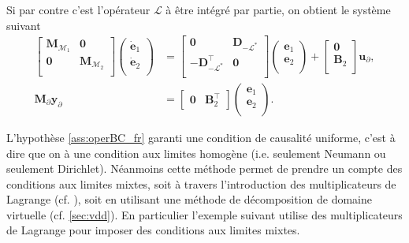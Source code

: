 Si par contre c'est l'opérateur $\mathcal{L}$ à être intégré par partie, on obtient le système suivant
\begin{equation*}
\begin{aligned}
\begin{bmatrix}
\mathbf{M}_{\mathcal{M}_1} & \mathbf{0} \\
\mathbf{0} & \mathbf{M}_{\mathcal{M}_2} \\
\end{bmatrix}
\begin{pmatrix}
\dot{\mathbf{e}}_{1} \\
\dot{\mathbf{e}}_{2} \\
\end{pmatrix}
&= \begin{bmatrix}
\mathbf{0} & \mathbf{D}_{-\mathcal{L}^*} \\
- \mathbf{D}_{-\mathcal{L}^*}^\top & \mathbf{0} \\
\end{bmatrix} 
\begin{pmatrix}
\mathbf{e}_{1} \\
\mathbf{e}_{2} \\
\end{pmatrix} + 
\begin{bmatrix}
\mathbf{0}\\
\mathbf{B}_2\\
\end{bmatrix}
\mathbf{u}_\partial, \\
\mathbf{M}_\partial {\mathbf{y}_\partial} &= 
\begin{bmatrix}
\mathbf{0} & \mathbf{B}_2^\top 
\end{bmatrix}\begin{pmatrix}
\mathbf{e}_{1} \\
\mathbf{e}_{2} \\
\end{pmatrix}.
\end{aligned}
\end{equation*}

L'hypothèse \ref{ass:operBC_fr} garanti une condition de causalité uniforme, c'est à dire que on à une condition aux limites homogène (i.e. seulement Neumann ou seulement Dirichlet). Néanmoins cette méthode permet de prendre un compte des conditions aux limites mixtes, soit à travers l'introduction des multiplicateurs de Lagrange (cf. ), soit en utilisant une méthode de décomposition de domaine virtuelle (cf. \ref{sec:vdd}). En particulier l'exemple suivant utilise des multiplicateurs de Lagrange pour imposer des conditions aux limites mixtes.

